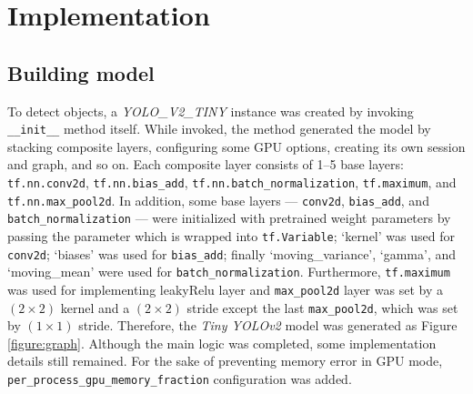 \documentclass[a4paper,12pt]{article}
\begin{document}
\section{Implementation}


\subsection{Building model}

To detect objects, a \emph{YOLO\_V2\_TINY} instance was created by invoking \lstinline{__init__} method itself. 
While invoked, the method generated the model by stacking composite layers, configuring some GPU options, creating its own session and graph, and so on. 
Each composite layer consists of 1--5 base layers: \lstinline{tf.nn.conv2d}, \lstinline{tf.nn.bias_add}, \lstinline{tf.nn.batch_normalization}, \lstinline{tf.maximum}, and \lstinline{tf.nn.max_pool2d}.
In addition, some base layers --- \lstinline{conv2d}, \lstinline{bias_add}, and \lstinline{batch_normalization} --- were initialized with pretrained weight parameters by passing the parameter which is wrapped into \lstinline{tf.Variable};
‘kernel’ was used for \lstinline{conv2d}; 
‘biases’ was used for \lstinline{bias_add};
finally ‘moving\_variance’, ‘gamma’, and ‘moving\_mean’ were used for \lstinline{batch_normalization}. Furthermore, \lstinline{tf.maximum} was used for implementing leakyRelu layer and \lstinline{max_pool2d} layer was set by a $(2 \times 2)$ kernel and a $(2 \times 2)$ stride except the last \lstinline{max_pool2d}, which was set by $(1 \times 1)$ stride. Therefore, the \emph{Tiny YOLOv2} model was generated as Figure \ref{figure:graph}.
Although the main logic was completed, some implementation details still remained. For the sake of preventing memory error in GPU mode, \lstinline{per_process_gpu_memory_fraction} configuration was added.
\end{document}
